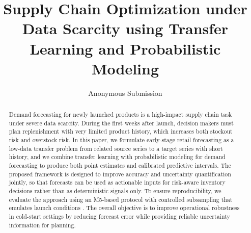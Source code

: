 \documentclass[3p,times,procedia]{elsarticle}
\begin{document}
\begin{frontmatter}



%

\title{Supply Chain Optimization under Data Scarcity using Transfer Learning and Probabilistic Modeling}




\author{Anonymous Submission}

\begin{abstract}
Demand forecasting for newly launched products is a high-impact supply chain task under severe data scarcity. During the first weeks after launch, decision makers must plan replenishment with very limited product history, which increases both stockout risk and overstock risk. In this paper, we formulate early-stage retail forecasting as a low-data transfer problem from related source series to a target series with short history, and we combine transfer learning with probabilistic modeling for demand forecasting to produce both point estimates and calibrated predictive intervals. The proposed framework is designed to improve accuracy and uncertainty quantification jointly, so that forecasts can be used as actionable inputs for risk-aware inventory decisions rather than as deterministic signals only. To ensure reproducibility, we evaluate the approach using an M5-based protocol with controlled subsampling that emulates launch conditions \cite{M5ForecastingUncertainty2020}. The overall objective is to improve operational robustness in cold-start settings by reducing forecast error while providing reliable uncertainty information for planning.
\end{abstract}


\end{frontmatter}
\end{document}
